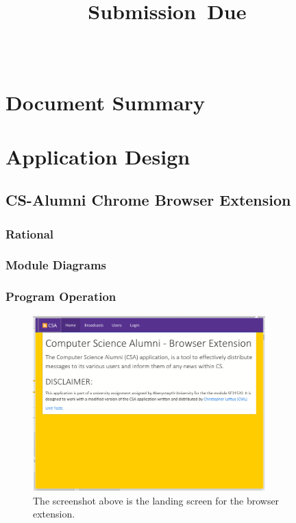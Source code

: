 \documentclass{article}
\title{
\vspace{2in}
\textmd{\textbf{\hmwkShortCode\\ \hmwkClass}}\\
\normalsize
\vspace{0.1in}
\textbf{\hmwkTitle}\\
\vspace{0.1in}
\small{Submission\ Due\ \hmwkClassTime\ \hmwkDueDate}\\
\vspace{3in}
}
\author{
\textbf{\hmwkAuthorName}\\
\hmwkStudentId
}
\date{} %
\begin{document}
\maketitle



\newpage
\tableofcontents
\newpage


\nocite{bara:2013:online}
\nocite{saa:2013:online}

\section{Document Summary}

\section{Application Design}

\subsection{CS-Alumni Chrome Browser Extension}

\subsubsection{Rational}

\subsubsection{Module Diagrams}

\subsubsection{Program Operation}

\begin{figure}[!htbp]
\centering
\includegraphics[width=0.8\textwidth]{homepage}
\caption{The screenshot above is the landing screen for the browser extension.}
\end{figure}
\end{document}
